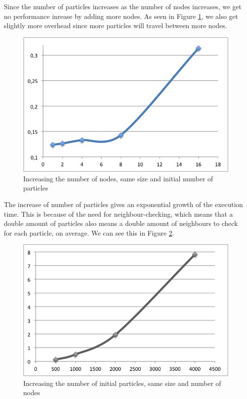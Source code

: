 \documentclass[a4paper]{article}
\begin{document}
Since the number of particles increases as the number of nodes
increases, we get no performance inrease by adding more nodes. As seen
in Figure \ref{fig1}, we also get slightly more overhead since more
particles will travel between more nodes.\\

\begin{figure}
  \centering
  \includegraphics{processor_scale.png}
  \caption{Increasing the number of nodes, same size and initial number of particles}
  \label{fig1}
\end{figure}

The increase of number of particles gives an exponential growth of the
execution time. This is because of the need for neighbour-checking,
which means that a double amount of particles also means a double amount
of neighbours to check for each particle, on average. We can see this in
Figure \ref{fig2}.\\

\begin{figure}
  \centering
  \includegraphics{particles_scale.png}
  \caption{Increasing the number of initial particles, same size and number of nodes}
  \label{fig2}
\end{figure}
\end{document}
